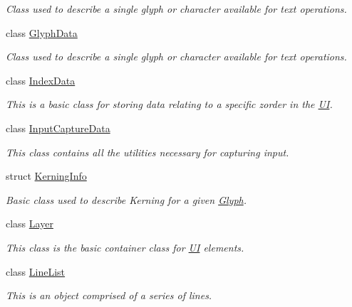 \begin{DoxyCompactItemize}
\begin{DoxyCompactList}\small\item\em Class used to describe a single glyph or character available for text operations. \item\end{DoxyCompactList}\item 
class \hyperlink{classMezzanine_1_1UI_1_1GlyphData}{GlyphData}
\begin{DoxyCompactList}\small\item\em Class used to describe a single glyph or character available for text operations. \item\end{DoxyCompactList}\item 
class \hyperlink{structMezzanine_1_1UI_1_1IndexData}{IndexData}
\begin{DoxyCompactList}\small\item\em This is a basic class for storing data relating to a specific zorder in the \hyperlink{namespaceMezzanine_1_1UI}{UI}. \item\end{DoxyCompactList}\item 
class \hyperlink{classMezzanine_1_1UI_1_1InputCaptureData}{InputCaptureData}
\begin{DoxyCompactList}\small\item\em This class contains all the utilities necessary for capturing input. \item\end{DoxyCompactList}\item 
struct \hyperlink{structMezzanine_1_1UI_1_1KerningInfo}{KerningInfo}
\begin{DoxyCompactList}\small\item\em Basic class used to describe Kerning for a given \hyperlink{classMezzanine_1_1UI_1_1Glyph}{Glyph}. \item\end{DoxyCompactList}\item 
class \hyperlink{classMezzanine_1_1UI_1_1Layer}{Layer}
\begin{DoxyCompactList}\small\item\em This class is the basic container class for \hyperlink{namespaceMezzanine_1_1UI}{UI} elements. \item\end{DoxyCompactList}\item 
class \hyperlink{classMezzanine_1_1UI_1_1LineList}{LineList}
\begin{DoxyCompactList}\small\item\em This is an object comprised of a series of lines. \item\end{DoxyCompactList}\item 

\end{DoxyCompactItemize}
